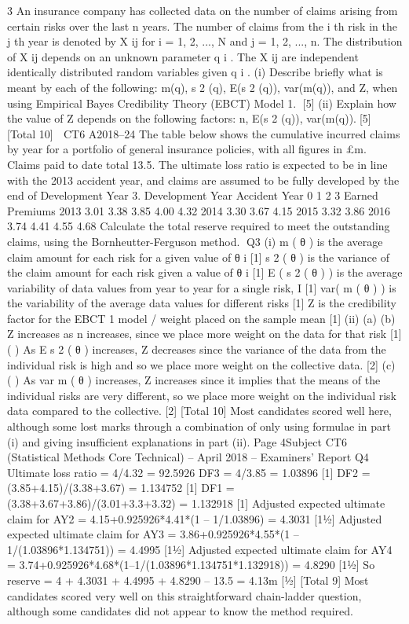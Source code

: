 3
An insurance company has collected data on the number of claims arising from
certain risks over the last n years. The number of claims from the i th risk in the j th
year is denoted by X ij for i = 1, 2, ..., N and j = 1, 2, ..., n.
The distribution of X ij depends on an unknown parameter q i . The X ij are independent
identically distributed random variables given q i .
(i) Describe briefly what is meant by each of the following: m(q), s 2 (q), E(s 2 (q)),
var(m(q)), and Z, when using Empirical Bayes Credibility Theory (EBCT)
Model 1.
[5]
(ii) Explain how the value of Z depends on the following factors: n, E(s 2 (q)),
var(m(q)).[5]
[Total 10]

CT6 A2018–24
The table below shows the cumulative incurred claims by year for a portfolio of
general insurance policies, with all figures in £m. Claims paid to date total 13.5. The
ultimate loss ratio is expected to be in line with the 2013 accident year, and claims are
assumed to be fully developed by the end of Development Year 3.
Development Year
Accident Year 0 1 2 3 Earned Premiums
2013 3.01 3.38 3.85 4.00 4.32
2014 3.30 3.67 4.15 2015 3.32 3.86 2016 3.74
4.41
4.55
4.68
Calculate the total reserve required to meet the outstanding claims, using the
Bornheutter-Ferguson method.
Q3
(i)
m ( θ ) is the average claim amount for each risk for a given value of θ i
[1]
s 2 ( θ ) is the variance of the claim amount for each risk given a value of θ i [1]
E ( s 2 ( θ ) ) is the average variability of data values from year to year for a single
risk, I [1]
var( m ( θ ) ) is the variability of the average data values for different risks [1]
Z is the credibility factor for the EBCT 1 model / weight placed on the sample
mean
[1]
(ii)
(a)
(b)
Z increases as n increases, since we place more weight on the data for
that risk
[1]
(
)
As E s 2 ( θ ) increases, Z decreases since the variance of the data
from the individual risk is high and so we place more weight on the
collective data.
[2]
(c)
(
)
As var m ( θ ) increases, Z increases since it implies that the means of
the individual risks are very different, so we place more weight on the
individual risk data compared to the collective.
[2]
[Total 10]
Most candidates scored well here, although some lost marks through a
combination of only using formulae in part (i) and giving insufficient
explanations in part (ii).
Page 4Subject CT6 (Statistical Methods Core Technical) – April 2018 – Examiners’ Report
Q4
Ultimate loss ratio = 4/4.32 = 92.5926%
DF3 = 4/3.85 = 1.03896 [1]
DF2 = (3.85+4.15)/(3.38+3.67) = 1.134752 [1]
DF1 = (3.38+3.67+3.86)/(3.01+3.3+3.32) = 1.132918 [1]
Adjusted expected ultimate claim for
AY2 = 4.15+0.925926*4.41*(1 – 1/1.03896) = 4.3031 [11⁄2]
Adjusted expected ultimate claim for AY3
= 3.86+0.925926*4.55*(1 – 1/(1.03896*1.134751)) = 4.4995 [11⁄2]
Adjusted expected ultimate claim for AY4
= 3.74+0.925926*4.68*(1–1/(1.03896*1.134751*1.132918)) = 4.8290 [11⁄2]
So reserve = 4 + 4.3031 + 4.4995 + 4.8290 – 13.5 = 4.13m
[1⁄2]
[Total 9]
Most candidates scored very well on this straightforward chain-ladder
question, although some candidates did not appear to know the method
required.
